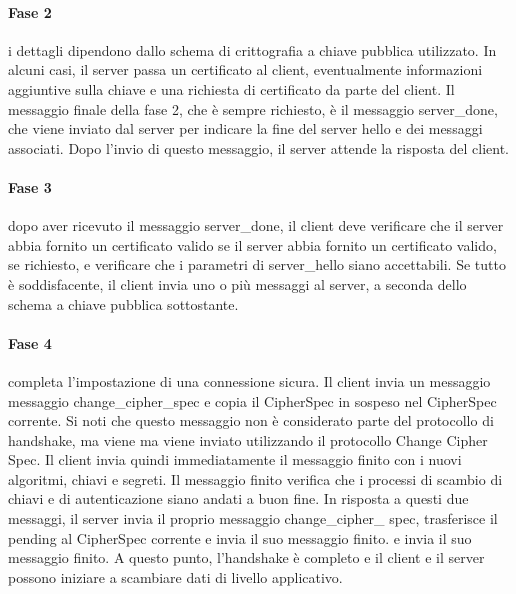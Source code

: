 \singlespacing

\paragraph{Fase 2} i dettagli dipendono dallo schema di crittografia a chiave pubblica utilizzato. In alcuni casi, il server passa un certificato al client, eventualmente informazioni aggiuntive sulla chiave e una richiesta di certificato da parte del client. Il messaggio finale della fase 2, che è sempre richiesto, è il messaggio server\_done, che viene inviato dal server per indicare la fine del server hello e dei messaggi associati. Dopo l'invio di questo messaggio, il server attende la risposta del client.

\singlespacing

\paragraph{Fase 3} dopo aver ricevuto il messaggio server\_done, il client deve verificare che il server abbia fornito un certificato valido se il server abbia fornito un certificato valido, se richiesto, e verificare che i parametri di server\_hello siano accettabili. Se tutto è soddisfacente, il client invia uno o più messaggi al server, a seconda dello schema a chiave pubblica sottostante.

\singlespacing

\paragraph{Fase 4} completa l'impostazione di una connessione sicura. Il client invia un messaggio messaggio change\_cipher\_spec e copia il CipherSpec in sospeso nel CipherSpec corrente. Si noti che questo messaggio non è considerato parte del protocollo di handshake, ma viene ma viene inviato utilizzando il protocollo Change Cipher Spec. Il client invia quindi immediatamente il messaggio finito con i nuovi algoritmi, chiavi e segreti. Il messaggio finito verifica che i processi di scambio di chiavi e di autenticazione siano andati a buon fine. In risposta a questi due messaggi, il server invia il proprio messaggio change\_cipher\_ spec, trasferisce il pending al CipherSpec corrente e invia il suo messaggio finito. e invia il suo messaggio finito. A questo punto, l'handshake è completo e il client e il server possono iniziare a scambiare dati di livello applicativo. 

\singlespacing

